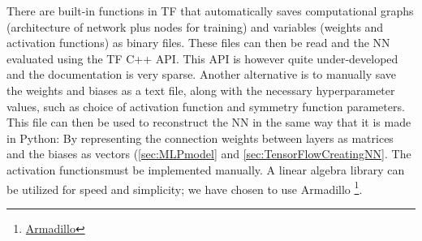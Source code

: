 \documentclass[twoside,english]{uiofysmaster}
\begin{document}
There are built-in functions in TF that automatically saves computational graphs (architecture of network plus
nodes for training) and variables (weights and activation functions) as binary files.
These files can then be read and the NN evaluated using the TF C++ API. This API is however quite under-developed
and the documentation is very sparse. Another alternative is to manually save the weights and biases
as a text file, along with the necessary hyperparameter values, such as choice of activation function and 
symmetry function parameters. This file 
can then be used to reconstruct the NN in the same way that it is made in Python: By representing
the connection weights between layers as matrices and the biases as vectors 
(\autoref{sec:MLPmodel} and \autoref{sec:TensorFlowCreatingNN}. 
The activation functionsmust be implemented manually. A linear algebra library can
be utilized for speed and simplicity; we have chosen to use Armadillo
\footnote{\href{http://arma.sourceforge.net/}{Armadillo}}. 
\end{document}
